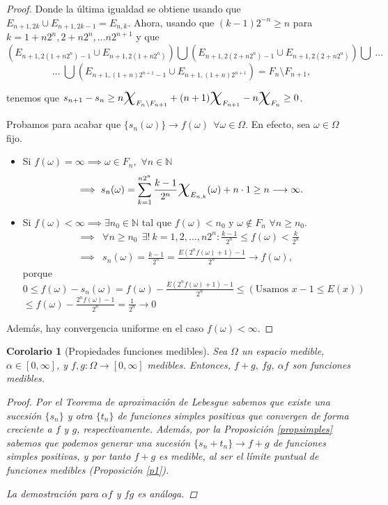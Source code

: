 \documentclass[11pt, a4paper]{article}
\theoremstyle{theorem-style}
\newtheorem{ncor}{Corolario}[section]
\theoremstyle{definition-style}
\theoremstyle{remark-style}
\theoremstyle{example-style}
\begin{document}
\begin{proof}
Donde la última igualdad se obtiene usando que $E_{n+1, 2k} \cup E_{n+1, 2k-1}=E_{n,k}$. Ahora, usando que $(k-1)2^{-n} \geq n$ para $k=1+n 2^n, 2+n 2^n,\dots n 2^{n+1}$ y que
\[
 \left( E_{n+1, 2(1+n2^n)-1} \cup E_{n+1, 2(1+n2^n)}  \right)
 \bigcup
 \left(E_{n+1, 2(2+n2^n)-1} \cup E_{n+1, 2(2+n2^n)} \right)
 \bigcup \
 \dots
\]
\[
 \dots \
 \bigcup
 \left( E_{n+1, (1+n)2^{n+1}-1} \cup E_{n+1, (1+n)2^{n+1}} \right) 
 =F_{n} \setminus F_{n+1},
\]

tenemos que $\displaystyle s_{n+1}-s_n \geq  n \text{\huge{$\chi$}}_{F_{n}\setminus F_{n+1}}+ (n+1) \text{\huge{$\chi$}}_{F_{n+1}} - n \text{\huge{$\chi$}}_{F_n} \geq 0$.


Probamos para acabar que $\{ s_n(\omega)\} \to f(\omega) \ \ \forall \omega\in\Omega$. En efecto, sea $\omega\in\Omega$ fijo. 
 \begin{itemize}
 \item Si $f(\omega)=\infty \implies \omega\in F_n, $ $\forall n\in \mathbb N$
 \[
 \implies s_n(\omega) =\sum_{k=1}^{n2^n} \frac{k-1}{2^n} \text{\huge{$\chi$}}_{E_{n,k}}(\omega) + n \cdot1\geq n\longrightarrow \infty .
 \]
 \item Si $f(\omega)<\infty \implies \exists n_0\in\mathbb N$ tal que $f(\omega)< n_0$ y $\omega\not\in F_n$ $\forall n\geq n_0$.
 \[
 \begin{aligned}
\implies& \forall n\geq n_0 \ \ \exists ! \ k= 1,2,\dots,n2^n : \frac{k-1}{2^n} \leq f(\omega) < \frac{k}{2^n}
\\
 \implies& s_n(\omega) = \frac{k-1}{2^n} = \frac{E(2^n f(\omega)+1)-1}{2^n} \longrightarrow f(\omega),
 \end{aligned}
  \]
porque $\displaystyle 0\leq f(\omega) - s_n(\omega) = f(\omega) - \frac{E(2^n f(\omega)+1)-1}{2^n} \le \left(\text{Usamos } x-1\leq E(x)\right)$\\ $\displaystyle \leq f(\omega) - \frac{2^n f(\omega)-1}{2^n}  = \frac{1}{2^n}\longrightarrow 0$
 \end{itemize}
\vspace{0.5em}
Además, hay convergencia uniforme en el caso $f(\omega) <\infty$.
\end{proof}

\begin{ncor}[Propiedades funciones medibles] Sea $\Omega$ un espacio medible, \mbox{$\alpha \in [0,\infty]$}, y $f,g : \Omega \to [0,\infty]$ medibles. Entonces, $f + g, \ fg, \ \alpha f$ son funciones medibles.
  \begin{proof}
    Por el \textit{Teorema de aproximación de Lebesgue} sabemos que existe una sucesión $\{s_n\}$ y otra $\{t_n\}$ de funciones simples positivas que convergen de forma creciente a $f$ y $g$, respectivamente. Además, por la \textit{Proposición \ref{propsimples}} sabemos que podemos generar una sucesión $\{s_n+t_n\} \to f+g$ de funciones simples positivas, y por tanto $f+g$ es medible, al ser el límite puntual de funciones medibles (\textit{Proposición \ref{p1}}).
    
    La demostración para $ \alpha f$ y $fg$ es análoga.
  \end{proof}
\end{ncor}
\end{document}
